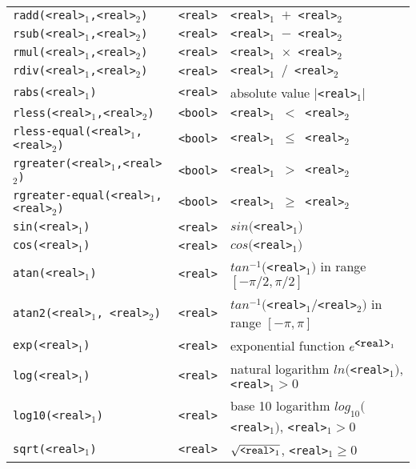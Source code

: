 \documentclass[twoside]{article} %
\begin{document}
\begin{tabular}{|l|l|p{8cm}|}
 {\tt radd(<real>$_1$,<real>$_2$)}      & {\tt  <real>}  & {\tt <real>$_1$ $+$ <real>$_2$} \\ 
 {\tt rsub(<real>$_1$,<real>$_2$)}      & {\tt  <real>} & {\tt <real>$_1$ $-$ <real>$_2$} \\ 
 {\tt rmul(<real>$_1$,<real>$_2$)}      & {\tt  <real>} & {\tt <real>$_1$ $\times$ <real>$_2$} \\ 
 {\tt rdiv(<real>$_1$,<real>$_2$)}      & {\tt  <real>} & {\tt <real>$_1$ $/$ <real>$_2$} \\
 {\tt rabs(<real>$_1$)}                 & {\tt  <real>}  & absolute value $|${\tt <real>}$_1 |$ \\
 {\tt rless(<real>$_1$,<real>$_2$)}     & {\tt  <bool>} & {\tt <real>$_1$ $<$ <real>$_2$} \\ 
 {\tt rless-equal(<real>$_1$,<real>$_2$)}& {\tt  <bool>} & {\tt <real>$_1$ $\leq$ <real>$_2$} \\ 
 {\tt rgreater(<real>$_1$,<real>$_2$)}  & {\tt  <bool>} & {\tt <real>$_1$ $>$ <real>$_2$} \\ 
 {\tt rgreater-equal(<real>$_1$,<real>$_2$)}& {\tt  <bool>} & {\tt <real>$_1$ $\geq$ <real>$_2$} \\ \hline
 {\tt sin(<real>$_1$)}                  & {\tt  <real>}  & $sin(${\tt <real>}$_1)$ \\ 
 {\tt cos(<real>$_1$)}                  & {\tt  <real>}  & $cos(${\tt <real>}$_1)$ \\ 
 {\tt atan(<real>$_1$)}                 & {\tt  <real>}  & $tan^{-1}(${\tt <real>}$_1)$ in range $[-\pi/2, \pi/2]$ \\ 
 {\tt atan2(<real>$_1$, <real>$_2$)}    & {\tt  <real>}  & $tan^{-1}(${\tt <real>}$_1 / ${\tt <real>}$_2 )$ in range $[-\pi, \pi]$ \\ 
 {\tt exp(<real>$_1$)}                  & {\tt  <real>}  & exponential function $e^{\mbox{{\tt <real>}}_1}$ \\ 
 {\tt log(<real>$_1$)}                  & {\tt  <real>}  & natural logarithm $ln(${\tt <real>}$_1)$, 
                                                           {\tt <real>}$_1 > 0$  \\ 
 {\tt log10(<real>$_1$)}                & {\tt  <real>}  &  base 10 logarithm $log_{10}(${\tt <real>}$_1)$,
                                                           {\tt <real>}$_1 > 0$  \\ 
 {\tt sqrt(<real>$_1$)}                 & {\tt  <real>}  & $\sqrt{\mbox{{\tt <real>}$_1$}}$,
                                                           {\tt <real>}$_1 \geq 0$  \\ \hline
\end{tabular}
\end{document}
